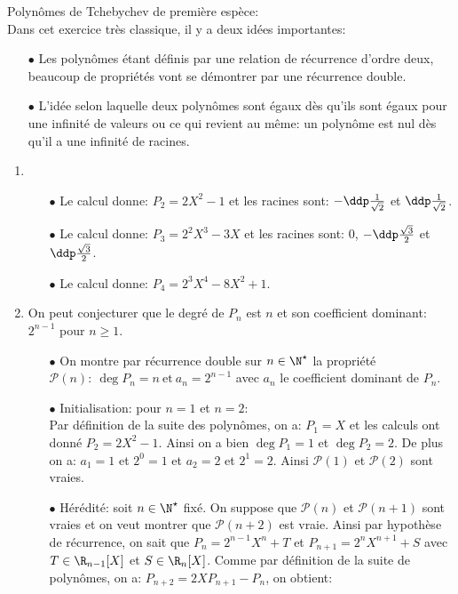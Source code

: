 \documentclass[a4paper, 11pt,reqno]{article}
\begin{document}
\begin{correction} Polyn\^{o}mes de Tchebychev de premi\`{e}re esp\`{e}ce:\\
	\noindent Dans cet exercice tr\`{e}s classique, il y a deux id\'ees importantes:
	\begin{itemize}
		\item[$\bullet$] Les polyn\^{o}mes \'etant d\'efinis par une relation de r\'ecurrence d'ordre deux, beaucoup de propri\'et\'es vont se d\'emontrer par une r\'ecurrence double.
		\item[$\bullet$] L'id\'ee selon laquelle deux polyn\^{o}mes sont \'egaux d\`{e}s qu'ils sont \'egaux pour une infinit\'e de valeurs ou ce qui revient au m\^{e}me: un polyn\^{o}me est nul d\`{e}s qu'il a une infinit\'e de racines.
	\end{itemize}
	\begin{enumerate}
		\item
		      \begin{itemize}
			      \item[$\bullet$] Le calcul donne: $P_2=2X^2-1$ et les racines sont: $-\ddp\frac{1}{\sqrt{2}}$ et $\ddp\frac{1}{\sqrt{2}}$.
			      \item[$\bullet$] Le calcul donne: $P_3=2^2X^3-3X$ et les racines sont: $0$, $-\ddp\frac{\sqrt{3}}{2}$ et $\ddp\frac{\sqrt{3}}{2}$.
			      \item[$\bullet$] Le calcul donne: $P_4=2^3X^4-8X^2+1$.
		      \end{itemize}
		\item On peut conjecturer que le degr\'e de $P_n$ est $n$ et son coefficient dominant: $2^{n-1}$ pour $n\geq 1$.
		      \begin{itemize}
			      \item[$\bullet$] On montre par r\'ecurrence double sur $n\in\N^{\star}$ la propri\'et\'e $\mathcal{P}(n):\ \deg{P_n}=n\ \mathrm{et}\ a_n=2^{n-1}$ avec $a_n$ le coefficient dominant de $P_n$.
			      \item[$\bullet$] Initialisation: pour $n=1$ et $n=2$:\\
			            \noindent Par d\'efinition de la suite des polyn\^{o}mes, on a: $P_1=X$ et les calculs ont donn\'e $P_2=2X^2-1$. Ainsi on a bien $\deg{P_1}=1$ et $\deg{P_2}=2$. De plus on a: $a_1=1$ et $2^0=1$ et $a_2=2$ et $2^1=2$. Ainsi $\mathcal{P}(1)$ et $\mathcal{P}(2)$ sont vraies.
			      \item[$\bullet$] H\'er\'edit\'e: soit $n\in\N^{\star}$ fix\'e. On suppose que $\mathcal{P}(n)$ et $\mathcal{P}(n+1)$ sont vraies et on veut montrer que $\mathcal{P}(n+2)$ est vraie. Ainsi par hypoth\`{e}se de r\'ecurrence, on sait que $P_n=2^{n-1}X^n+T$ et $P_{n+1}=2^{n}X^{n+1}+S$ avec $T\in\R_{n-1}\lbrack X\rbrack$ et $S\in\R_{n}\lbrack X\rbrack$. Comme par d\'efinition de la suite de polyn\^{o}mes, on a: $P_{n+2}=2XP_{n+1}-P_n$, on obtient:

\end{itemize}
\end{enumerate}
\end{correction}
\end{document}
